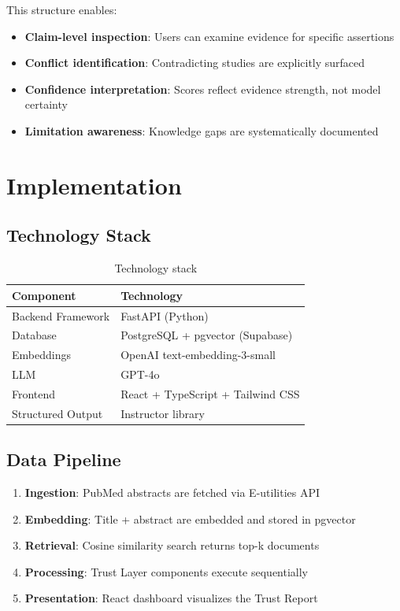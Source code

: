 \documentclass[11pt,a4paper]{article}
\begin{document}
This structure enables:
\begin{itemize}
    \item \textbf{Claim-level inspection}: Users can examine evidence for specific assertions
    \item \textbf{Conflict identification}: Contradicting studies are explicitly surfaced
    \item \textbf{Confidence interpretation}: Scores reflect evidence strength, not model certainty
    \item \textbf{Limitation awareness}: Knowledge gaps are systematically documented
\end{itemize}

\section{Implementation}

\subsection{Technology Stack}

\begin{table}[H]
\centering
\begin{tabular}{ll}
\toprule
\textbf{Component} & \textbf{Technology} \\
\midrule
Backend Framework & FastAPI (Python) \\
Database & PostgreSQL + pgvector (Supabase) \\
Embeddings & OpenAI text-embedding-3-small \\
LLM & GPT-4o \\
Frontend & React + TypeScript + Tailwind CSS \\
Structured Output & Instructor library \\
\bottomrule
\end{tabular}
\caption{Technology stack}
\end{table}

\subsection{Data Pipeline}

\begin{enumerate}
    \item \textbf{Ingestion}: PubMed abstracts are fetched via E-utilities API
    \item \textbf{Embedding}: Title + abstract are embedded and stored in pgvector
    \item \textbf{Retrieval}: Cosine similarity search returns top-k documents
    \item \textbf{Processing}: Trust Layer components execute sequentially
    \item \textbf{Presentation}: React dashboard visualizes the Trust Report
\end{enumerate}
\end{document}
